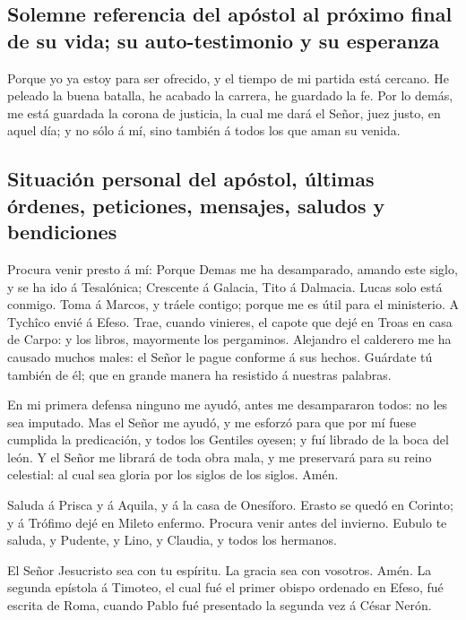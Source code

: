 \hypertarget{solemne-referencia-del-apuxf3stol-al-pruxf3ximo-final-de-su-vida-su-auto-testimonio-y-su-esperanza}{%
\subsection{Solemne referencia del apóstol al próximo final de su vida;
su auto-testimonio y su
esperanza}\label{solemne-referencia-del-apuxf3stol-al-pruxf3ximo-final-de-su-vida-su-auto-testimonio-y-su-esperanza}}

 Porque yo ya estoy para ser ofrecido, y el tiempo de mi
partida está cercano.  He peleado la buena batalla, he
acabado la carrera, he guardado la fe.  Por lo demás, me
está guardada la corona de justicia, la cual me dará el Señor, juez
justo, en aquel día; y no sólo á mí, sino también á todos los que aman
su venida.

\hypertarget{situaciuxf3n-personal-del-apuxf3stol-uxfaltimas-uxf3rdenes-peticiones-mensajes-saludos-y-bendiciones}{%
\subsection{Situación personal del apóstol, últimas órdenes, peticiones,
mensajes, saludos y
bendiciones}\label{situaciuxf3n-personal-del-apuxf3stol-uxfaltimas-uxf3rdenes-peticiones-mensajes-saludos-y-bendiciones}}

 Procura venir presto á mí:  Porque Demas me ha
desamparado, amando este siglo, y se ha ido á Tesalónica; Crescente á
Galacia, Tito á Dalmacia.  Lucas solo está conmigo. Toma á
Marcos, y tráele contigo; porque me es útil para el ministerio.
 A Tychîco envié á Efeso.  Trae, cuando
vinieres, el capote que dejé en Troas en casa de Carpo: y los libros,
mayormente los pergaminos.  Alejandro el calderero me ha
causado muchos males: el Señor le pague conforme á sus hechos.
 Guárdate tú también de él; que en grande manera ha
resistido á nuestras palabras.

 En mi primera defensa ninguno me ayudó, antes me
desampararon todos: no les sea imputado.  Mas el Señor me
ayudó, y me esforzó para que por mí fuese cumplida la predicación, y
todos los Gentiles oyesen; y fuí librado de la boca del león.
 Y el Señor me librará de toda obra mala, y me preservará
para su reino celestial: al cual sea gloria por los siglos de los
siglos. Amén.

 Saluda á Prisca y á Aquila, y á la casa de Onesíforo.
 Erasto se quedó en Corinto; y á Trófimo dejé en Mileto
enfermo.  Procura venir antes del invierno. Eubulo te
saluda, y Pudente, y Lino, y Claudia, y todos los hermanos.

 El Señor Jesucristo sea con tu espíritu. La gracia sea con
vosotros. Amén. La segunda epístola á Timoteo, el cual fué el primer
obispo ordenado en Efeso, fué escrita de Roma, cuando Pablo fué
presentado la segunda vez á César Nerón.
